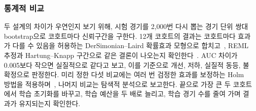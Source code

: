 \subsubsection{통계적 비교}
두 설계의 차이가 우연인지 보기 위해, 시험 경기를 2,000번 다시 뽑는 경기 단위 쌍대 bootstrap으로 코호트마다 신뢰구간을 구한다.
12개 코호트의 결과는 코호트마다 효과가 다를 수 있음을 허용하는 DerSimonian--Laird 확률효과 모형으로 합치고~\cite{DerSimonian86}, REML 추정과 Hartung--Knapp 구간으로 같은 결론이 나오는지 확인한다~\cite{HartungKnapp01}.
AUC 차이가 0.005보다 작으면 실질적으로 같다고 보고, 이를 기준으로 개선, 저하, 실질적 동등, 불확정으로 판정한다.
미리 정한 다섯 비교에는 여러 번 검정한 효과를 보정하는 Holm 방법을 적용하며~\cite{Holm79}, 나머지 비교는 탐색적 분석으로 보고한다.
끝으로 가장 큰 두 코호트에서 학습 초기화를 바꾸고, 학습 예산을 두 배로 늘리고, 학습 경기 수를 줄여 가며 결과가 유지되는지 확인한다.
